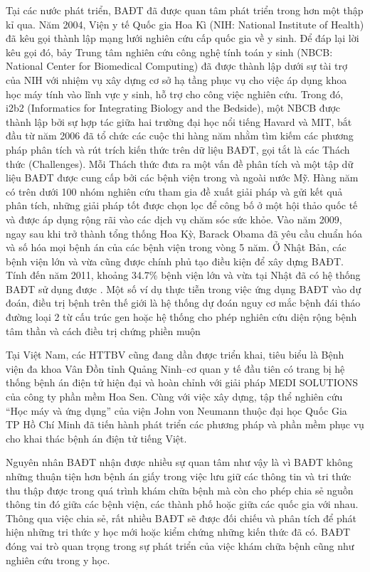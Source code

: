 Tại các nước phát triển, BAĐT đã được quan tâm phát triển trong hơn một thập kỉ qua. Năm 2004, Viện y tế Quốc gia Hoa Kì (NIH: National Institute of Health) đã kêu gọi thành lập mạng lưới nghiên cứu cấp quốc gia về y sinh. Để đáp lại lời kêu gọi đó, bảy Trung tâm nghiên cứu công nghệ tính toán y sinh (NBCB: National Center for Biomedical Computing) đã được thành lập dưới sự tài trợ của NIH với nhiệm vụ xây dựng cơ sở hạ tầng phục vụ cho việc áp dụng khoa học máy tính vào lĩnh vực y sinh, hỗ trợ cho công việc nghiên cứu. Trong đó, i2b2 (Informatics for Integrating Biology and the Bedside), một NBCB được thành lập bởi sự hợp tác giữa hai trường đại học nổi tiếng Havard và MIT, bắt đầu từ năm 2006 đã tổ chức các cuộc thi hàng năm nhằm tìm kiếm các phương pháp phân tích và rút trích kiến thức trên dữ liệu BAĐT, gọi tắt là các Thách thức (Challenges). Mỗi Thách thức đưa ra một vấn đề phân tích và một tập dữ liệu BAĐT được cung cấp bởi các bệnh viện trong và ngoài nước Mỹ. Hàng năm có trên dưới 100 nhóm nghiên cứu tham gia đề xuất giải pháp và gửi kết quả phân tích, những giải pháp tốt được chọn lọc để công bố ở một hội thảo quốc tế và được áp dụng rộng rãi vào các dịch vụ chăm sóc sức khỏe. Vào năm 2009, ngay sau khi trở thành tổng thống Hoa Kỳ, Barack Obama đã yêu cầu chuẩn hóa và số hóa mọi bệnh án của các bệnh viện trong vòng 5 năm. Ở Nhật Bản, các bệnh viện lớn và vừa cũng được chính phủ tạo điều kiện để xây dựng BAĐT. Tính đến năm 2011, khoảng 34.7\% bệnh viện lớn và vừa tại Nhật đã có hệ thống BAĐT sử dụng được \cite{HoTuBao2015}. Một số ví dụ thực tiễn trong việc ứng dụng BAĐT vào dự đoán, điều trị bệnh trên thế giới là hệ thống dự đoán nguy cơ mắc bệnh đái tháo đường loại 2 từ cấu trúc gen \cite{AbelKho2012} hoặc hệ thống cho phép nghiên cứu diện rộng bệnh tâm thần và cách điều trị chứng phiền muộn \cite{Perlis2012}

Tại Việt Nam, các HTTBV cũng đang dần được triển khai, tiêu biểu là Bệnh viện đa khoa Vân Đồn tỉnh Quảng Ninh--cơ quan y tế đầu tiên có trang bị hệ thống bệnh án điện tử hiện đại và hoàn chỉnh với giải pháp MEDI SOLUTIONS của công ty phần mềm Hoa Sen. Cùng với việc xây dựng, tập thể nghiên cứu ``Học máy và ứng dụng'' của viện John von Neumann thuộc đại học Quốc Gia TP Hồ Chí Minh đã tiến hành phát triển các phương pháp và phần mềm phục vụ cho khai thác bệnh án điện tử tiếng Việt.

Nguyên nhân BAĐT nhận được nhiều sự quan tâm như vậy là vì BAĐT không những thuận tiện hơn bệnh án giấy trong việc lưu giữ các thông tin và tri thức thu thập được trong quá trình khám chữa bệnh mà còn cho phép chia sẻ nguồn thông tin đó giữa các bệnh viện, các thành phố hoặc giữa các quốc gia với nhau. Thông qua việc chia sẻ, rất nhiều BAĐT sẽ được đối chiếu và phân tích để phát hiện những tri thức y học mới hoặc kiểm chứng những kiến thức đã có. BAĐT đóng vai trò quan trọng trong sự phát triển của việc khám chữa bệnh cũng như nghiên cứu trong y học.

